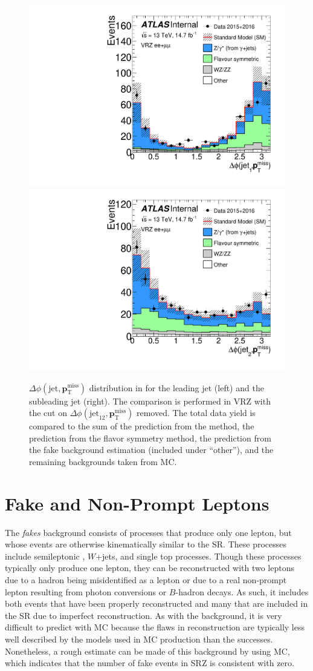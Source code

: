 \begin{centering}
\begin{figure}[!hbt]
\myfloatalign
\includegraphics[width=.45\linewidth]{figures/photons/METJetLeading_azmet_ee+mm_onz_VR.pdf}
\includegraphics[width=.45\linewidth]{figures/photons/METJetSecond_azmet_ee+mm_onz_VR.pdf}
\caption{ $\Delta\phi(\text{jet},{\boldsymbol p}_{\mathrm{T}}^\mathrm{miss})$ distribution in for the leading jet (left) and the subleading jet (right). The comparison is performed in VRZ with the cut on $\Delta\phi(\text{jet}_{12},{\boldsymbol p}_{\mathrm{T}}^\mathrm{miss})$ removed.  The total data yield is compared to the sum of the prediction from the \gjets method, the prediction from the flavor symmetry method, the prediction from the fake background estimation (included under ``other''), and the remaining backgrounds taken from \ac{MC}.}
\label{fig:photon_dphi}
\end{figure}
\end{centering}


\section{Fake and Non-Prompt Leptons}
\label{sec:bg-fake}

The \textit{fakes} background consists of processes that produce only one lepton, but whose events are otherwise kinematically similar to the \ac{SR}. These processes include semileptonic \ttbar, $W$+jets, and single top processes. Though these processes typically only produce one lepton, they can be reconstructed with two leptons due to a hadron being misidentified as a lepton or due to a real non-prompt lepton resulting from photon conversions or $B$-hadron decays. As such, it includes both events that have been properly reconstructed and many that are included in the \ac{SR} due to imperfect reconstruction. As with the \dyjets background, it is very difficult to predict with \ac{MC} because the flaws in reconstruction are typically less well described by the models used in \ac{MC} production than the successes. Nonetheless, a rough estimate can be made of this background by using \ac{MC}, which indicates that the number of fake events in SRZ is consistent with zero. 

